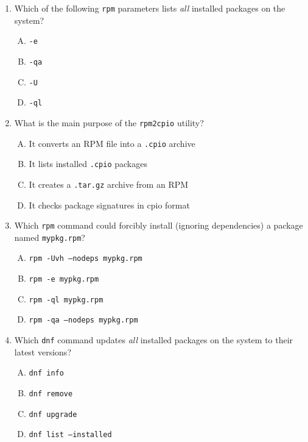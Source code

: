 \documentclass[a4paper]{report}
\begin{document}
\begin{enumerate}[1.]
    \item Which of the following \texttt{rpm} parameters lists \emph{all} installed packages on the system?  
    \begin{enumerate}[A)]
        \item \texttt{-e}  
        \item \texttt{-qa}  
        \item \texttt{-U}  
        \item \texttt{-ql}  
    \end{enumerate}

    \item What is the main purpose of the \texttt{rpm2cpio} utility?  
    \begin{enumerate}[A)]
        \item It converts an RPM file into a \texttt{.cpio} archive  
        \item It lists installed \texttt{.cpio} packages  
        \item It creates a \texttt{.tar.gz} archive from an RPM  
        \item It checks package signatures in cpio format  
    \end{enumerate}

    \item Which \texttt{rpm} command could forcibly install (ignoring dependencies) a package named \texttt{mypkg.rpm}?  
    \begin{enumerate}[A)]
        \item \texttt{rpm -Uvh --nodeps mypkg.rpm}  
        \item \texttt{rpm -e mypkg.rpm}  
        \item \texttt{rpm -ql mypkg.rpm}  
        \item \texttt{rpm -qa --nodeps mypkg.rpm}  
    \end{enumerate}

    \item Which \texttt{dnf} command updates \emph{all} installed packages on the system to their latest versions?  
    \begin{enumerate}[A)]
        \item \texttt{dnf info}  
        \item \texttt{dnf remove}  
        \item \texttt{dnf upgrade}  
        \item \texttt{dnf list --installed}  
    \end{enumerate}


\end{enumerate}
\end{document}
